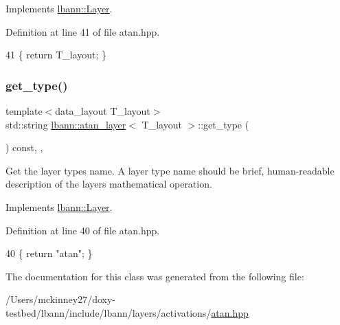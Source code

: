 Implements \hyperlink{classlbann_1_1Layer_a5dfb66e81fc085997402a5e2241316bd}{lbann\+::\+Layer}.



Definition at line 41 of file atan.\+hpp.


\begin{DoxyCode}
41 \{ \textcolor{keywordflow}{return} T\_layout; \}
\end{DoxyCode}
\mbox{\label{classlbann_1_1atan__layer_a4971aa6ba30e72d0e589993621c925a0}} 
\subsubsection{\texorpdfstring{get\+\_\+type()}{get\_type()}}
{\footnotesize\ttfamily template$<$data\+\_\+layout T\+\_\+layout$>$ \\
std\+::string \hyperlink{classlbann_1_1atan__layer}{lbann\+::atan\+\_\+layer}$<$ T\+\_\+layout $>$\+::get\+\_\+type (\begin{DoxyParamCaption}{ }\end{DoxyParamCaption}) const\hspace{0.3cm}{\ttfamily [inline]}, {\ttfamily [override]}, {\ttfamily [virtual]}}

Get the layer type\textquotesingle{}s name. A layer type name should be brief, human-\/readable description of the layer\textquotesingle{}s mathematical operation. 

Implements \hyperlink{classlbann_1_1Layer_a0fa0ea9160b490c151c0a17fde4f7239}{lbann\+::\+Layer}.



Definition at line 40 of file atan.\+hpp.


\begin{DoxyCode}
40 \{ \textcolor{keywordflow}{return} \textcolor{stringliteral}{"atan"}; \}
\end{DoxyCode}


The documentation for this class was generated from the following file\+:\begin{DoxyCompactItemize}
\item 
/\+Users/mckinney27/doxy-\/testbed/lbann/include/lbann/layers/activations/\hyperlink{atan_8hpp}{atan.\+hpp}\end{DoxyCompactItemize}
